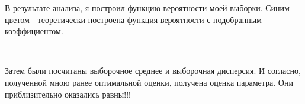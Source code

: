 \documentclass[a4paper,12pt, oneside]{book}
\begin{document}
В результате анализа, я построил функцию вероятности моей выборки. Синим цветом - теоретически построена функция вероятности с подобранным коэффициентом.\\

\begin{figure}[h!]
	\begin{center}
		\begin{minipage}[h]{0.47\linewidth}
			  \\
			\vspace{15mm}
		\end{minipage}
	\end{center}
\end{figure}

Затем были посчитаны выборочное среднее и выборочная дисперсия. И согласно, полученной мною ранее оптимальной оценки, получена оценка параметра. Они приблизительно оказались равны!!!

\begin{figure}[h!]
	\begin{center}
		\begin{minipage}[h]{0.47\linewidth}
			\\
			\vspace{15mm}
		\end{minipage}
		\hfill	
		\begin{minipage}[h]{0.47\linewidth}
			 \\
		\end{minipage}
		\end{center}
\end{figure}
\end{document}
